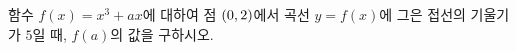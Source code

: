 함수 $f(x)=x^3+ax$에 대하여 점 $(0{,}\mkern3mu\mathopen{}2)$에서 곡선 $y=f(x)$에 그은 접선의 기울기가 $5$일 때, $f(a)$의 값을 구하시오. 
